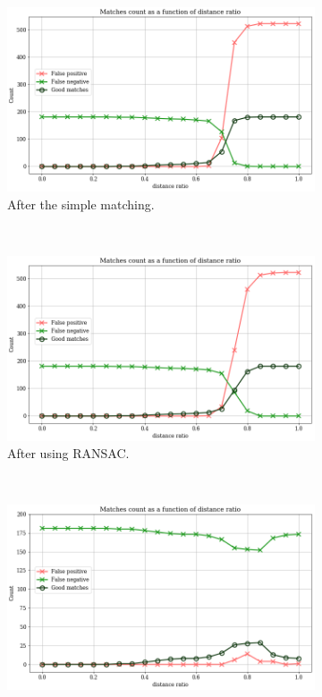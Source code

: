 \documentclass[fleqn,10pt]{wlpeerj} %
\begin{document}
\begin{figure}[H]
\centering
\begin{subfigure}{0.32\textwidth}
    \includegraphics[width=1\linewidth]{res_1.png}
    \caption{After the simple matching.}
    \label{res:1}
\end{subfigure}
~
\begin{subfigure}{0.32\textwidth}
    \includegraphics[width=1\linewidth]{res_2.png}
    \caption{After using RANSAC.}
    \label{res:2}
\end{subfigure}
~
\begin{subfigure}{0.32\textwidth}
    \includegraphics[width=1\linewidth]{res_3.png}

\end{subfigure}
\end{figure}
\end{document}
